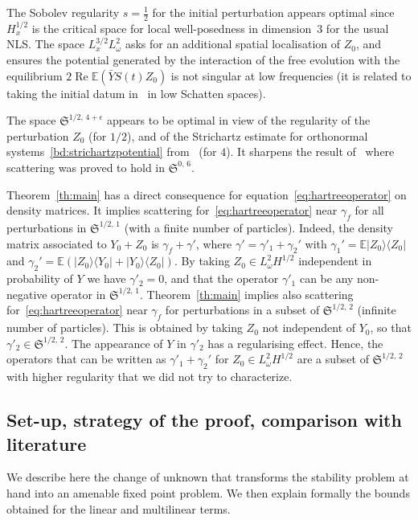 \documentclass[AHL, Unicode, longabstracts,published]{cedram}
\newcommand{\E}{\mathbb{E}}
\DeclareMathOperator{\re}{Re}
\newcommand{\frkS}{\mathfrak{S}}
\begin{document}
\begin{rema}
The Sobolev regularity $s=\frac12$ for the initial perturbation appears optimal since $H^{1/2}_x$ is the critical space for local well-posedness in dimension~$3$ for the usual NLS. The space $L^{3/2}_xL^2_\omega$ asks for an additional spatial localisation of $Z_0$, and ensures the potential generated by the interaction of the free evolution with the equilibrium $2\re \E(\bar Y S(t)Z_0)$ is not singular at low frequencies (it is related to taking the initial datum in~\cite{CHP2,lewsab2} in low Schatten spaces).

The space $\frkS^{1/2,\,4+\epsilon}$ appears to be optimal in view of the regularity of the perturbation $Z_0$ (for $1/2$), and of the Strichartz estimate for orthonormal systems~\eqref{bd:strichartzpotential} from~\cite{FLLS,FS} (for $4$). It sharpens the result of~\cite{CHP2} where scattering was proved to hold in $\frkS^{0,\,6}$.
\end{rema}


\begin{rema}
Theorem~\ref{th:main} has a direct consequence for equation~\eqref{eq:hartreeoperator} on density matrices. It implies scattering for~\eqref{eq:hartreeoperator} near $\gamma_f$ for all perturbations in $\frkS^{1/2,\,1}$ (with a finite number of particles). Indeed, the density matrix associated to $Y_0+Z_0$ is $\gamma_f+\gamma'$, where $\gamma'=\gamma'_1+\gamma_2'$ with $\gamma_1'=\E |Z_0\rangle \langle Z_0|$ and $\gamma_2'=\E (|Z_0\rangle \langle Y_0|+|Y_0\rangle \langle Z_0|)$. By taking $Z_0\in L^2_\omega H^{1/2}$ independent in probability of $Y$ we have $\gamma'_2=0$, and that the operator $\gamma'_1$ can be any non-negative operator in $\frkS^{1/2,\,1}$. Theorem~\ref{th:main} implies also scattering for~\eqref{eq:hartreeoperator} near $\gamma_f$ for perturbations in a subset of $\frkS^{1/2,\,2}$ (infinite number of particles). This is obtained by taking $Z_0$ not independent of $Y_0$, so that $\gamma'_2\in \frkS^{1/2,\,2}$. The appearance of $Y$ in $\gamma'_2$ has a regularising effect. Hence, the operators that can be written as $\gamma'_1+\gamma_2'$ for $Z_0\in L^2_\omega H^{1/2}$ are a subset of $\frkS^{1/2,\,2}$ with higher regularity that we did not try to characterize.
\end{rema}



\subsection{Set-up, strategy of the proof, comparison with literature} \label{setup}
We describe here the change of unknown that transforms the stability problem at hand into an amenable fixed point problem. We then explain formally the bounds obtained for the linear and multilinear terms.
\end{document}
